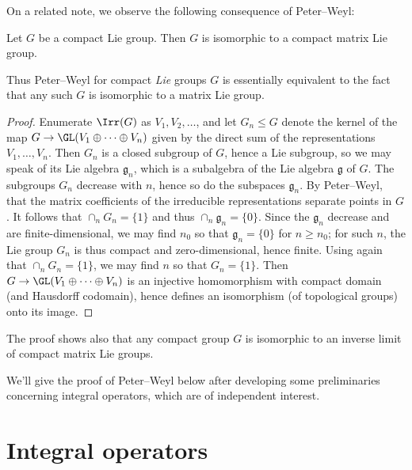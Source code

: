 \documentclass[reqno]{amsart} 
\begin{document}
On a related note, we observe the following consequence of Peter--Weyl:
\begin{corollary}\label{sec:cor-peter-weyl-matrix}
  Let $G$ be a compact Lie group.  Then $G$ is isomorphic to a compact matrix Lie group.
\end{corollary}
Thus Peter--Weyl for compact \emph{Lie} groups $G$ is essentially equivalent to the fact that any such $G$ is isomorphic to a matrix Lie group.
\begin{proof}
  Enumerate $\Irr(G)$ as $V_1,V_2,\dotsc$, and let $G_n \leq G$ denote the kernel of the map $G \rightarrow \GL(V_1 \oplus \dotsb \oplus V_n)$ given by the direct sum of the representations $V_1,\dotsc,V_n$.  Then $G_n$ is a closed subgroup of $G$, hence a Lie subgroup, so we may speak of its Lie algebra $\mathfrak{g}_n$, which is a subalgebra of the Lie algebra $\mathfrak{g}$ of $G$.  The subgroups $G_n$ decrease with $n$, hence so do the subspaces $\mathfrak{g}_n$.  By Peter--Weyl, that the matrix coefficients of the irreducible representations separate points in $G$.  It follows that $\cap_{n} G_n = \{1\}$ and thus $\cap_{n} \mathfrak{g}_n = \{0\}$.  Since the $\mathfrak{g}_n$ decrease and are finite-dimensional, we may find $n_0$ so that $\mathfrak{g}_{n} = \{0\}$ for $n \geq n_0$; for such $n$, the Lie group $G_n$ is thus compact and zero-dimensional, hence finite.  Using again that $\cap_{n} G_n = \{1\}$, we may find $n$ so that $G_{n} = \{1\}$.  Then $G \rightarrow \GL(V_1 \oplus \dotsb \oplus V_n)$ is an injective homomorphism with compact domain (and Hausdorff codomain), hence defines an isomorphism (of topological groups) onto its image.
\end{proof}

The proof shows also that any compact group $G$ is isomorphic to an inverse limit of compact matrix Lie groups.

We'll give the proof of Peter--Weyl below after developing some preliminaries concerning integral operators, which are of independent interest.


\newpage
\section{Integral operators}\label{sec:integral-operators}
\end{document}
